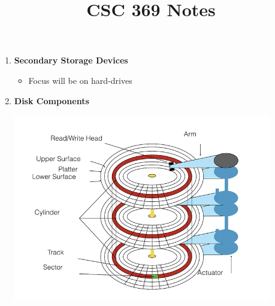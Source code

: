 \documentclass[12pt]{article}
\begin{document}
\title{CSC 369 Notes}

\begin{enumerate}[1.]
    \item \textbf{Secondary Storage Devices}
    \begin{itemize}
        \item Focus will be on hard-drives
    \end{itemize}
    \item \textbf{Disk Components}

    \begin{center}
    \includegraphics[width=0.8\linewidth]{images/notes_1.png}
    \end{center}


\end{enumerate}
\end{document}
